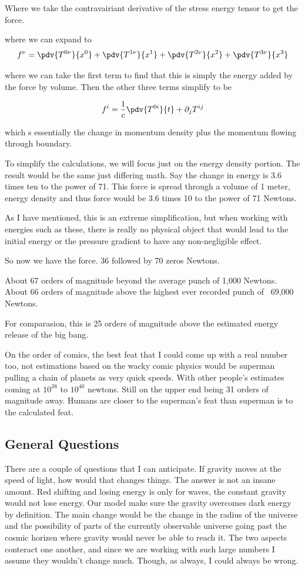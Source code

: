   Where we take the contravairiant derivative of the stress energy tensor to get the force.

  where we can expand to
\[
f^\nu = \pdv{T^{0\nu}}{x^0} + \pdv{T^{1\nu}}{x^1} + \pdv{T^{2\nu}}{x^2} + \pdv{T^{3\nu}}{x^3}
  \]

  where we can take the first term to find that this is simply the energy added by the force by volume. Then the other three terms simplify to be

\[
f^i = \frac{1}{c}\pdv{T^{0i}}{t} + \partial_j T^{ij}
  \]

  which s essentially the change in momentum density plus the momentum flowing through boundary.

  To simplify the calculations, we will focus just on the energy density portion. The result would be the same just differing math. Say the change in energy is 3.6 times ten to the power of 71. This force is spread through a volume of 1 meter, energy density and thus force would be 3.6 times 10 to the power of 71 Newtons.

  As I have mentioned, this is an extreme simplification, but when working with energies such as these, there is really no physical object that would lead to the initial energy or the pressure gradient to have any non-negligible effect.

  So now we have the force. 36 followed by 70 zeros Newtons.

  About 67 orders of magnitude beyond the average punch of 1,000 Newtons. About 66 orders of magnitude above the highest ever recorded punch of ~69,000 Newtons.

  For comparasion, this is 25 orders of magnitude above the estimated energy release of the big bang.

  On the order of comics, the best feat that I could come up with a real number too, not estimations based on the wacky comic physics would be superman pulling a chain of planets as very quick speeds. With other people's estimates coming at $10^{38}$ to $10^{40}$ newtons. Still on the upper end being 31 orders of magnitude away. Humans are closer to the superman's feat than superman is to the calculated feat.


\subsection{General Questions}

There are a couple of questions that I can anticipate. If gravity moves at the speed of light, how would that changes things. The answer is not an insane amount. Red shifting and losing energy is only for waves, the constant gravity would not lose energy. Our model make sure the gravity overcomes dark energy by definition. The main change would be the change in the radius of the universe and the possibility of parts of the currently observable universe going past the cosmic horizen where gravity would never be able to reach it. The two aspects conteract one another, and since we are working with such large numbers I assume they wouldn't change much. Though, as always, I could always be wrong.


